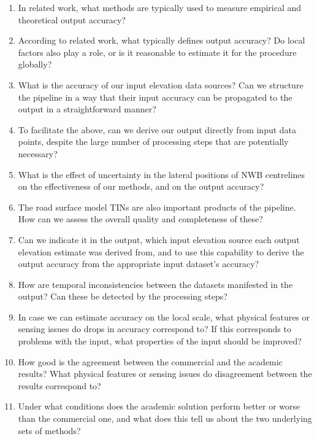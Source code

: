 \begin{enumerate}
    \begin{enumerate}
        \item In related work, what methods are typically used to measure empirical and theoretical output accuracy?
        \item According to related work, what typically defines output accuracy? Do local factors also play a role, or is it reasonable to estimate it for the procedure globally?
        \item What is the accuracy of our input elevation data sources? Can we structure the pipeline in a way that their input accuracy can be propagated to the output in a straightforward manner?
        \item To facilitate the above, can we derive our output directly from input data points, despite the large number of processing steps that are potentially necessary?
        \item What is the effect of uncertainty in the lateral positions of NWB centrelines on the effectiveness of our methods, and on the output accuracy?
        \item The road surface model TINs are also important products of the pipeline. How can we assess the overall quality and completeness of these?
        \item Can we indicate it in the output, which input elevation source each output elevation estimate was derived from, and to use this capability to derive the output accuracy from the appropriate input dataset's accuracy?
        \item How are temporal inconsistencies between the datasets manifested in the output? Can these be detected by the processing steps?
        \item In case we can estimate accuracy on the local scale, what physical features or sensing issues do drops in accuracy correspond to? If this corresponds to problems with the input, what properties of the input should be improved?
        \item How good is the agreement between the commercial and the academic results? What physical features or sensing issues do disagreement between the results correspond to?
        \item Under what conditions does the academic solution perform better or worse than the commercial one, and what does this tell us about the two underlying sets of methods?
    \end{enumerate}
\end{enumerate}